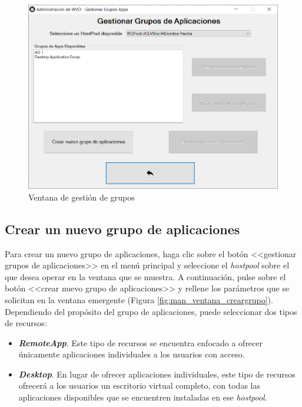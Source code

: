 \begin{figure}[h]
  \centering
  \includegraphics[width=0.9\linewidth]{figures/images/script/ventana_gestion.PNG}
  \caption{Ventana de gestión de grupos}
  \label{fig:man_ventana_gestion}
\end{figure}

\clearpage

\subsection{Crear un nuevo grupo de aplicaciones}
Para crear un nuevo grupo de aplicaciones, haga clic sobre el botón <<gestionar grupos de aplicaciones>> en el menú principal y seleccione el \textit{hostpool} sobre el que desea operar en la ventana que se muestra. A continuación, pulse sobre el botón <<crear nuevo grupo de aplicaciones>> y rellene los parámetros que se solicitan en la ventana emergente (Figura \ref{fig:man_ventana_creargrupo}). Dependiendo del propósito del grupo de aplicaciones, puede seleccionar dos tipos de recursos:

\begin{itemize}
    \item \textbf{\textit{RemoteApp}}. Este tipo de recursos se encuentra enfocado a ofrecer únicamente aplicaciones individuales a los usuarios con acceso.
    
    \item \textbf{\textit{Desktop}}. En lugar de ofrecer aplicaciones individuales, este tipo de recursos ofrecerá a los usuarios un escritorio virtual completo, con todas las aplicaciones disponibles que se encuentren instaladas en ese \textit{hostpool}.
\end{itemize}

